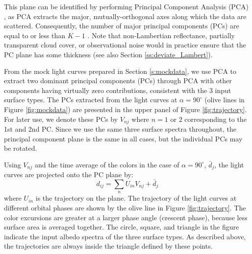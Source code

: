 \documentclass[iop,numberedappendix,apj]{emulateapj}
\begin{document}
This plane can be identified by performing Principal Component Analysis (PCA) \citep{Cowan2009,Cowan2011}, as PCA extracts the major, mutually-orthogonal axes along which the data are scattered. 
Consequently, the number of major principal components (PCs) are equal to or less than $K-1$ \citep{Cowan2011}. 
Note that non-Lambertian reflectance, partially transparent cloud cover, or observational noise would in practice ensure that the PC plane has some thickness (see also Section \ref{ss:deviate_Lambert}). 

From the mock light curves prepared in Section \ref{s:mockdata}, 
we use PCA to extract two dominant principal components (PCs) through PCA with other components having virtually zero contributions, consistent with the 3 input surface types.  
The PCs extracted from the light curves at $\alpha = 90^{\circ }$ (olive lines in Figure \ref{fig:mockdata}) are presented in the upper panel of Figure \ref{fig:trajectory}. 
For later use, we denote these PCs by $V_{nj}$ where $n=1$ or $2$  corresponding to the 1st and 2nd PC. 
Since we use the same three surface spectra throughout, the principal component plane is the same in all cases, but the individual PCs may be rotated. 

Using $V_{nj}$ and the time average of the colors in the case of $\alpha = 90^{\circ }$, $\bar d_j$, the light curves are projected onto the PC plane by:
\begin{equation}
d_{ij} = \sum_n U_{in} V_{nj} + \bar d_j
\end{equation}
where $U_{in}$ is the trajectory on the plane. 
The trajectory of the light curves at different orbital phases are shown by the olive line in Figure \ref{fig:trajectory}. 
The color excursions are greater at a larger phase angle (crescent phase), because less surface area is averaged together.  
The circle, square, and triangle in the figure indicate the input albedo spectra of the three surface types. 
As described above, the trajectories are always inside the triangle defined by these points.  
\end{document}
